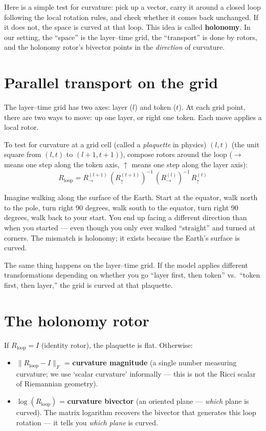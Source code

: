 \documentclass[11pt, twoside, openright]{memoir}
\newcommand{\gp}{\,}              %
\begin{document}
\begin{whycare}
Here is a simple test for curvature: pick up a vector, carry it around a closed loop following the local rotation rules, and check whether it comes back unchanged. If it does not, the space is curved at that loop. This idea is called \textbf{holonomy}.  In our setting, the ``space'' is the
layer--time grid, the ``transport'' is done by rotors, and the holonomy
rotor's bivector points in the \emph{direction} of curvature.
\end{whycare}

\section{Parallel transport on the grid}

The layer--time grid has two axes: layer ($l$) and token ($t$).  At each
grid point, there are two ways to move: up one layer, or right one token.
Each move applies a local rotor.

To test for curvature at a grid cell (called a \emph{plaquette} in physics) $(l, t)$ (the unit square
from $(l,t)$ to $(l+1, t+1)$), compose rotors around the loop ($\rightarrow$ means one step along the token axis, $\uparrow$ means one step along the layer axis):
\[
  R_{\text{loop}} = R_{\rightarrow}^{(l+1)} \gp
    (R_{\uparrow}^{(t+1)})^{-1} \gp
    (R_{\rightarrow}^{(l)})^{-1} \gp
    R_{\uparrow}^{(t)}
\]

\begin{analogy}
Imagine walking along the surface of the Earth.  Start at the equator,
walk north to the pole, turn right 90 degrees, walk south to the
equator, turn right 90 degrees, walk back to your start.  You end up
facing a different direction than when you started --- even though you
only ever walked ``straight'' and turned at corners.  The mismatch is
holonomy; it exists because the Earth's surface is curved.

The same thing happens on the layer--time grid.  If the model applies
different transformations depending on whether you go ``layer first,
then token'' vs.\ ``token first, then layer,'' the grid is curved at
that plaquette.
\end{analogy}

\section{The holonomy rotor}

If $R_{\text{loop}} = I$ (identity rotor), the plaquette is flat.
Otherwise:
\begin{itemize}[nosep]
\item $\|R_{\text{loop}} - I\|_F$ = \textbf{curvature magnitude}
  (a single number measuring curvature; we use `scalar curvature' informally --- this is not the Ricci scalar of Riemannian geometry).
\item $\log(R_{\text{loop}})$ = \textbf{curvature bivector}
  (an oriented plane --- \emph{which} plane is curved).
  The matrix logarithm recovers the bivector that generates this loop rotation --- it tells you \emph{which plane} is curved.
\end{itemize}
\end{document}
